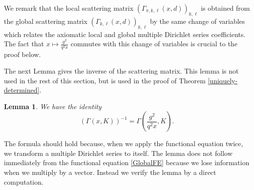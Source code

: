 \documentclass[11pt,letterpaper]{article}
\newtheorem{lemma}[theorem]{Lemma}
\theoremstyle{definition}
\theoremstyle{remark}
\numberwithin{equation}{section}
\theoremstyle{dotless}
\begin{document}
We remark that the local scattering matrix $\left( \Gamma_{\pi, k, \ell}(x, d)\right)_{k, \ell}$ is obtained from the global scattering matrix $\left( \Gamma_{k, \ell}(x, d) \right)_{k, \ell}$ by the same change of variables which relates the axiomatic local and global multiple Dirichlet series coefficients. The fact that $x \mapsto \frac{g^2}{q^2 x}$ commutes with this change of variables is crucial to the proof below. 

The next Lemma gives the inverse of the scattering matrix. This lemma is not used in the rest of this section, but is used in the proof of Theorem \ref{uniquely-determined}.

\begin{lemma}\label{scattering-matrix-inverse} We have the identity \[(\Gamma(x,K))^{-1}= \Gamma(\frac{g^2}{q^2x} ,K).\]\end{lemma}

The formula should hold because, when we apply the functional equation twice, we transform a multiple Dirichlet series to itself. The lemma does not follow immediately from the functional equation \eqref{GlobalFE} because we lose information when we multiply by a vector. Instead we verify the lemma by a direct computation.
\end{document}
